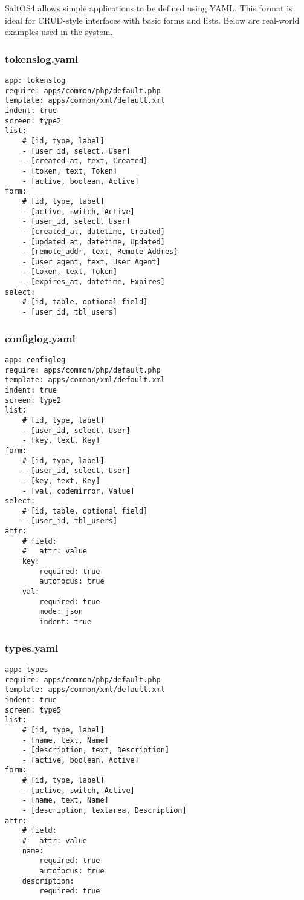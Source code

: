 \documentclass[a4paper]{article}
\begin{document}
SaltOS4 allows simple applications to be defined using YAML. This format is ideal for CRUD-style interfaces with basic forms and lists. Below are real-world examples used in the system.

\hypertarget{toc50}{}
\subsubsection{tokenslog.yaml}

\begin{lstlisting}
app: tokenslog
require: apps/common/php/default.php
template: apps/common/xml/default.xml
indent: true
screen: type2
list:
    # [id, type, label]
    - [user_id, select, User]
    - [created_at, text, Created]
    - [token, text, Token]
    - [active, boolean, Active]
form:
    # [id, type, label]
    - [active, switch, Active]
    - [user_id, select, User]
    - [created_at, datetime, Created]
    - [updated_at, datetime, Updated]
    - [remote_addr, text, Remote Addres]
    - [user_agent, text, User Agent]
    - [token, text, Token]
    - [expires_at, datetime, Expires]
select:
    # [id, table, optional field]
    - [user_id, tbl_users]
\end{lstlisting}

\hypertarget{toc51}{}
\subsubsection{configlog.yaml}

\begin{lstlisting}
app: configlog
require: apps/common/php/default.php
template: apps/common/xml/default.xml
indent: true
screen: type2
list:
    # [id, type, label]
    - [user_id, select, User]
    - [key, text, Key]
form:
    # [id, type, label]
    - [user_id, select, User]
    - [key, text, Key]
    - [val, codemirror, Value]
select:
    # [id, table, optional field]
    - [user_id, tbl_users]
attr:
    # field:
    #   attr: value
    key:
        required: true
        autofocus: true
    val:
        required: true
        mode: json
        indent: true
\end{lstlisting}

\hypertarget{toc52}{}
\subsubsection{types.yaml}

\begin{lstlisting}
app: types
require: apps/common/php/default.php
template: apps/common/xml/default.xml
indent: true
screen: type5
list:
    # [id, type, label]
    - [name, text, Name]
    - [description, text, Description]
    - [active, boolean, Active]
form:
    # [id, type, label]
    - [active, switch, Active]
    - [name, text, Name]
    - [description, textarea, Description]
attr:
    # field:
    #   attr: value
    name:
        required: true
        autofocus: true
    description:
        required: true
\end{lstlisting}
\end{document}
